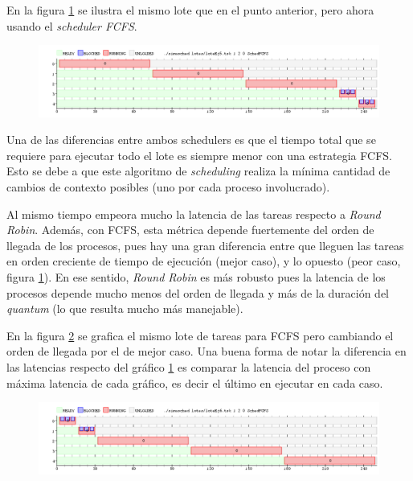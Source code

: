 En la figura \ref{fig:ej6-1} se ilustra el mismo lote que en el punto anterior, pero ahora usando el \emph{scheduler FCFS}.

\begin{figure}[H]
  \centering
  \includegraphics[width=1\textwidth]{img/imgEj6-1}
  \caption{}
  \label{fig:ej6-1}
\end{figure}

Una de las diferencias entre ambos schedulers es que el tiempo total que se requiere para ejecutar todo el lote es siempre menor con una estrategia FCFS. Esto se debe a que este algoritmo de \emph{scheduling} realiza la mínima cantidad de cambios de contexto posibles (uno por cada proceso involucrado).

Al mismo tiempo empeora mucho la latencia de las tareas respecto a \emph{Round Robin}. Además, con FCFS, esta métrica depende fuertemente del orden de llegada de los procesos, pues hay una gran diferencia entre que lleguen las tareas en orden creciente de tiempo de ejecución (mejor caso), y lo opuesto (peor caso, figura \ref{fig:ej6-1}). En ese sentido, \emph{Round Robin} es más robusto pues la latencia de los procesos depende mucho menos del orden de llegada y más de la duración del \emph{quantum} (lo que resulta mucho más manejable). 

En la figura \ref{fig:ej6-2} se grafica el mismo lote de tareas para FCFS pero cambiando el orden de llegada por el de mejor caso. Una buena forma de notar la diferencia en las latencias respecto del gráfico \ref{fig:ej6-1} es comparar la latencia del proceso con máxima latencia de cada gráfico, es decir el último en ejecutar en cada caso.

\begin{figure}[H]
  \centering
  \includegraphics[width=1\textwidth]{img/imgEj6-2}
  \caption{}
  \label{fig:ej6-2}
\end{figure}


